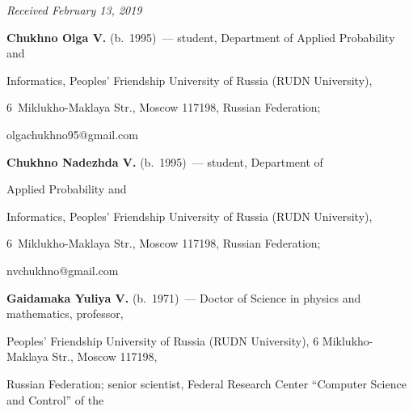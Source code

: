\vspace*{-3pt}





\hfill{\small\textit{Received February 13, 2019}} 










\Contr





\noindent


\textbf{Chukhno Olga V.} (b.\ 1995)~--- student, Department of Applied Probability and 


Informatics, Peoples' Friendship University of Russia (RUDN University), 


 6~Miklukho-Maklaya Str., Moscow 117198, Russian Federation; 


\mbox{olgachukhno95@gmail.com}





\vspace*{3pt}





\noindent


\textbf{Chukhno Nadezhda V.} (b.\ 1995)~---  student, Department of 


Applied Probability and 


Informatics, Peoples' Friendship University of Russia (RUDN University),  


6~Miklukho-Maklaya Str., Moscow 117198, Russian Federation; 


\mbox{nvchukhno@gmail.com}





\vspace*{3pt}





\noindent


\textbf{Gaidamaka Yuliya V.} (b.\ 1971)~--- Doctor of Science in physics and mathematics, professor, 


Peoples' Friendship University of Russia (RUDN University), 6 Miklukho-Maklaya Str., Moscow 117198, 


Russian Federation; senior scientist, Federal Research Center ``Computer Science and Control'' of the 


